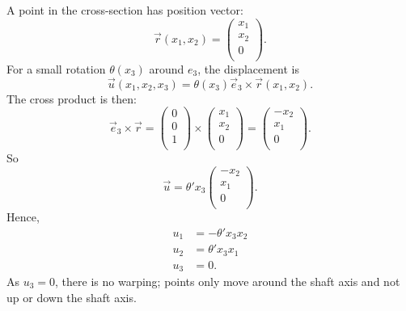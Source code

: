 A point in the cross-section has position vector:
\begin{equation*}
  \Vec{r}(x_1, x_2) = \begin{pmatrix}
    x_1\\
  x_2\\
  0\\
  \end{pmatrix}
.\end{equation*}
For a small rotation $\theta(x_3)$ around $e_3$, the displacement is
\begin{equation*}
  \Vec{u}(x_1,x_2,x_3) = \theta(x_3) \Vec{e}_3 \times \Vec{r}(x_1, x_2)
.\end{equation*}
The cross product is then:
\begin{equation*}
  \Vec{e}_3 \times \Vec{r} = \begin{pmatrix}
    0\\
  0\\
  1\\
  \end{pmatrix} \times \begin{pmatrix}
    x_1\\
  x_2\\
  0\\
  \end{pmatrix} = \begin{pmatrix}
    -x_2\\
  x_1\\
  0\\
  \end{pmatrix}
.\end{equation*}
So
\begin{equation*}
  \Vec{u} = \theta' x_3 \begin{pmatrix}
    - x_2\\
  x_1\\
  0\\
  \end{pmatrix}
.\end{equation*}
Hence,
\begin{align*}
  u_1 &=  - \theta' x_3 x_2 \\
  u_2 &= \theta' x_3 x_1 \\
  u_3 &= 0
.\end{align*}
As $u_3 = 0$, there is no warping; points only move around the shaft axis and not up or down the shaft axis.

